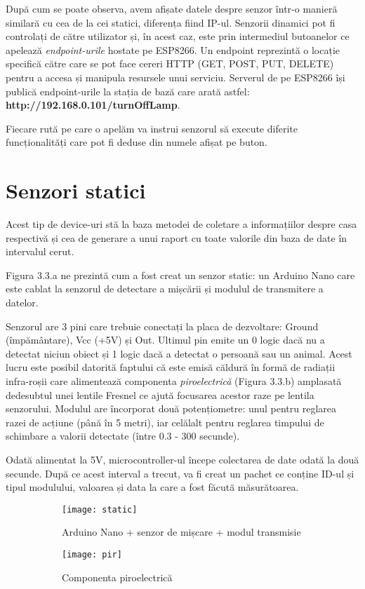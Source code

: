 După cum se poate observa, avem afișate datele despre senzor într-o manieră similară cu cea de la cei statici, diferența fiind IP-ul. Senzorii dinamici pot fi controlați de către utilizator și, în acest caz, este prin intermediul butoanelor ce apelează \emph{endpoint-urile} hostate pe ESP8266. Un endpoint reprezintă o locație specifică către care se pot face cereri HTTP (GET, POST, PUT, DELETE) pentru a accesa și manipula resursele unui serviciu. Serverul de pe ESP8266 își publică endpoint-urile la stația de bază care arată astfel: \textbf{http://192.168.0.101/turnOffLamp}.

Fiecare rută pe care o apelăm va instrui senzorul să execute diferite funcționalități care pot fi deduse din numele afișat pe buton.


\section{Senzori statici}

Acest tip de device-uri stă la baza metodei de coletare a informațiilor despre casa respectivă și cea de generare a unui raport cu toate valorile din baza de date în intervalul cerut.

Figura 3.3.a ne prezintă cum a fost creat un senzor static: un Arduino Nano care este cablat la senzorul de detectare a mișcării și modulul de transmitere a datelor. 

Senzorul are 3 pini care trebuie conectați la placa de dezvoltare: Ground (împământare), Vcc (+5V) și Out. Ultimul pin emite un 0 logic dacă nu a detectat niciun obiect și 1 logic dacă a detectat o persoană sau un animal. Acest lucru este posibil datorită faptului că este emisă căldură în formă de radiații infra-roșii care alimentează componenta \emph{piroelectrică} (Figura 3.3.b) amplasată dedesubtul unei lentile Fresnel ce ajută focusarea acestor raze pe lentila senzorului. Modulul are încorporat două potențiometre: unul pentru reglarea razei de acțiune (până în 5 metri), iar celălalt pentru reglarea timpului de schimbare a valorii detectate (între 0.3 - 300 secunde). 

Odată alimentat la 5V, microcontroller-ul începe colectarea de date odată la două secunde. După ce acest interval a trecut, va fi creat un pachet ce conține ID-ul și tipul modulului, valoarea și data la care a fost făcută măsurătoarea. 

\begin{figure}[h]
	\centering
	\begin{subfigure}{0.85\textwidth}
		\centering
		\texttt{[image: static]}
		\caption{Arduino Nano + senzor de mișcare + modul transmisie}
		\label{fig:static}
	\end{subfigure}
	\hfill
	\begin{subfigure}{0.8\textwidth}
		\centering
		\texttt{[image: pir]}
		\caption{Componenta piroelectrică}
		\label{fig:pir}
	\end{subfigure}
	\caption{}
	\label{fig:all2}
\end{figure}
\break

